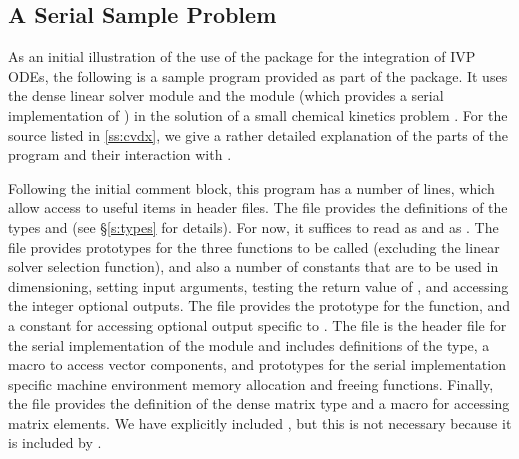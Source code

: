 
\subsection{A Serial Sample Problem}\label{ss:serial_sim_ex}

As an initial illustration of the use of the {\cvodes} package for the
integration of IVP ODEs, the following is a sample program provided as part 
of the package.  It uses the {\cvodes} dense linear solver module {\cvdense} 
and the {\nvecs} module (which provides a serial implementation of {\nvector})
in the solution of a small chemical kinetics problem
.
For the source listed in \A\ref{ss:cvdx}, we give a rather detailed explanation of 
the parts of the program and their interaction with {\cvodes}.

Following the initial comment block, this program has a number
of  lines, which allow access to useful items in {\cvodes}
header files.  The  file provides the definitions of the
types  and  (see \S\ref{s:types} for
details).  For now, it suffices to read  as  and
 as .
The  file provides prototypes for the three {\cvodes}
functions to be called (excluding the linear solver selection
function), and also a number of constants that are to be used in
dimensioning, setting input arguments, testing the return value of
, and accessing the integer optional outputs.
The  file provides the prototype for the  
function, and a constant  for accessing optional output 
specific to {\cvdense}.  
The  file is the header file for the serial implementation
of the {\nvector} module and includes definitions of the 
 type, a macro to access vector components, and prototypes 
for the serial implementation specific machine environment memory allocation
and freeing functions.
Finally, the  file provides the definition of the dense
matrix type  and a macro for accessing matrix elements.
We have explicitly included , but this is not necessary because 
it is included by .

